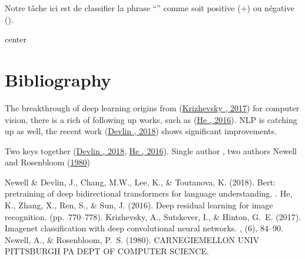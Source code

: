 \documentclass[letterpaper,11pt,english]{sphinxmanual}
\begin{document}
\sphinxAtStartPar
Notre tâche ici est de classifier la phrase “” comme soit positive (+) ou négative (\sphinxhyphen{}).

\begin{sphinxuseclass}{center}
\begin{sphinxVerbatim}[commandchars=\\\{\}]
                                                             
\end{sphinxVerbatim}

\end{sphinxuseclass}
\sphinxstepscope


\section{Bibliography}
\label{\detokenize{bibliography:bibliography}}\label{\detokenize{bibliography::doc}}
\sphinxAtStartPar
The breakthrough of deep learning origins from
(\hyperlink{cite.bibliography:id9}{Krizhevsky , 2017}) for computer vision, there is a rich of
following up works, such as (\hyperlink{cite.bibliography:id10}{He , 2016}). NLP is catching up as
well, the recent work (\hyperlink{cite.bibliography:id8}{Devlin , 2018}) shows significant
improvements.

\sphinxAtStartPar
Two keys together (\hyperlink{cite.bibliography:id8}{Devlin , 2018}, \hyperlink{cite.bibliography:id10}{He , 2016}). Single author
, two authors Newell and Rosenbloom (\hyperlink{cite.bibliography:id12}{1980})

\begin{sphinxthebibliography}{Newell \&}
\sphinxAtStartPar
Devlin, J., Chang, M.\sphinxhyphen{}W., Lee, K., \& Toutanova, K. (2018). Bert: pre\sphinxhyphen{}training of deep bidirectional transformers for language understanding. .
\sphinxAtStartPar
He, K., Zhang, X., Ren, S., \& Sun, J. (2016). Deep residual learning for image recognition.  (pp. 770–778).
\sphinxAtStartPar
Krizhevsky, A., Sutskever, I., \& Hinton, G. E. (2017). Imagenet classification with deep convolutional neural networks. , (6), 84–90.
\sphinxAtStartPar
Newell, A., \& Rosenbloom, P. S. (1980).  CARNEGIE\sphinxhyphen{}MELLON UNIV PITTSBURGH PA DEPT OF COMPUTER SCIENCE.
\end{sphinxthebibliography}



\renewcommand{\indexname}{Index}
\printindex
\end{document}
